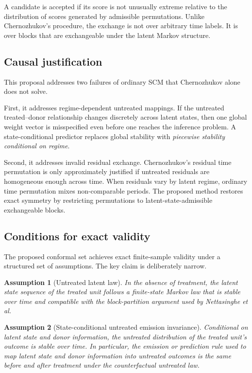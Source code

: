 \documentclass[11pt]{article}
\newtheorem{assumption}{Assumption}
\begin{document}
A candidate is accepted if its score is not unusually extreme relative to the distribution of scores generated by admissible permutations. Unlike Chernozhukov's procedure, the exchange is not over arbitrary time labels. It is over blocks that are exchangeable under the latent Markov structure.

\subsection{Causal justification}

This proposal addresses two failures of ordinary SCM that Chernozhukov alone does not solve.

First, it addresses regime-dependent untreated mappings. If the untreated treated--donor relationship changes discretely across latent states, then one global weight vector is misspecified even before one reaches the inference problem. A state-conditional predictor replaces global stability with \emph{piecewise stability conditional on regime}.

Second, it addresses invalid residual exchange. Chernozhukov's residual time permutation is only approximately justified if untreated residuals are homogeneous enough across time. When residuals vary by latent regime, ordinary time permutation mixes non-comparable periods. The proposed method restores exact symmetry by restricting permutations to latent-state-admissible exchangeable blocks.

\subsection{Conditions for exact validity}

The proposed conformal set achieves exact finite-sample validity under a structured set of assumptions. The key claim is deliberately narrow.

\begin{assumption}[Untreated latent law]
In the absence of treatment, the latent state sequence of the treated unit follows a finite-state Markov law that is stable over time and compatible with the block-partition argument used by Nettasinghe et al.
\end{assumption}

\begin{assumption}[State-conditional untreated emission invariance]
Conditional on latent state and donor information, the untreated distribution of the treated unit's outcome is stable over time. In particular, the emission or prediction rule used to map latent state and donor information into untreated outcomes is the same before and after treatment under the counterfactual untreated law.
\end{assumption}
\end{document}
